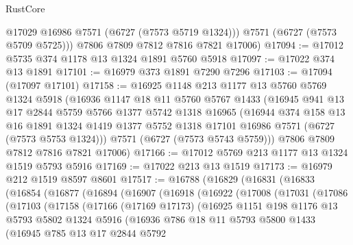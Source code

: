 \begin{lexlean}{RustCore}
\begin{coremodule}
          @17029
          @16986
          @7571
          (@6727 (@7573 @5719 @1324)))
        @7571
        (@6727 (@7573 @5709 @5725)))
      @7806
      @7809
      @7812
      @7816
      @7821
      @17006)
@17094 := @17012 @5735 @374 @1178 @13 @1324 @1891 @5760 @5918
@17097 := @17022 @374 @13 @1891
@17101 := @16979 @373 @1891 @7290 @7296
@17103 := @17094 (@17097 @17101)
@17158 := @16925
    @1148
    @213
    @1177
    @13
    @5760
    @5769
    @1324
    @5918
    (@16936
      @1147
      @18
      @11
      @5760
      @5767
      @1433
      (@16945
        @941
        @13
        @17
        @2844
        @5759
        @5766
        @1377
        @5742
        @1318
        @16965
        (@16944
          @374
          @158
          @13
          @16
          @1891
          @1324
          @1419
          @1377
          @5752
          @1318
          @17101
          @16986
          @7571
          (@6727 (@7573 @5753 @1324)))
        @7571
        (@6727 (@7573 @5743 @5759)))
      @7806
      @7809
      @7812
      @7816
      @7821
      @17006)
@17166 := @17012 @5769 @213 @1177 @13 @1324 @1519 @5793 @5916
@17169 := @17022 @213 @13 @1519
@17173 := @16979 @212 @1519 @8597 @8601
@17517 := @16788
    (@16829
      (@16831
        (@16833
          (@16854
            (@16877
              (@16894
                (@16907
                  (@16918
                    (@16922
                      (@17008
                        (@17031
                          (@17086
                            (@17103
                              (@17158
                                (@17166
                                  (@17169 @17173)
                                  (@16925
                                    @1151
                                    @198
                                    @1176
                                    @13
                                    @5793
                                    @5802
                                    @1324
                                    @5916
                                    (@16936
                                      @786
                                      @18
                                      @11
                                      @5793
                                      @5800
                                      @1433
                                      (@16945
                                        @785
                                        @13
                                        @17
                                        @2844
                                        @5792

\end{coremodule}
\end{lexlean}
